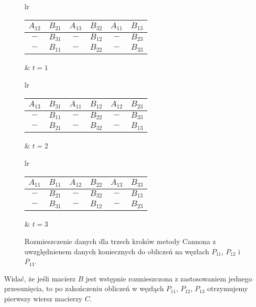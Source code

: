 \begin{figure}[H]
\centering
\begin{tabular}{lr}
\begin{tabular}{|cc|cc|cc|}
\hline
\(A_{12}\) & \(B_{21}\) & \(A_{13}\) & \(B_{32}\) & \(A_{11}\) & \(B_{13}\) \\
\hline
\(-\) & \(B_{31}\) & \(-\) & \(B_{12}\) & \(-\) & \(B_{23}\) \\
\hline
\(-\) & \(B_{11}\) & \(-\) & \(B_{22}\) & \(-\) & \(B_{33} \) \\
\hline
\end{tabular} &
\hspace{1cm}\(t=1\)
\end{tabular}

\vspace{0.5cm}

\begin{tabular}{lr}
\begin{tabular}{|cc|cc|cc|}
\hline
\(A_{13}\) & \(B_{31}\) & \(A_{11}\) & \(B_{12}\) & \(A_{12}\) & \(B_{23}\) \\
\hline
\(-\) & \(B_{11}\) & \(-\) & \(B_{22}\) & \(-\) & \(B_{33}\) \\
\hline
\(-\) & \(B_{21}\) & \(-\) & \(B_{32}\) & \(-\) & \(B_{13} \) \\
\hline
\end{tabular} &
\hspace{1cm}\(t=2\)
\end{tabular}

\vspace{0.5cm}

\begin{tabular}{lr}
\begin{tabular}{|cc|cc|cc|}
\hline
\(A_{11}\) & \(B_{11}\) & \(A_{12}\) & \(B_{22}\) & \(A_{13}\) & \(B_{33}\) \\
\hline
\(-\) & \(B_{21}\) & \(-\) & \(B_{32}\) & \(-\) & \(B_{13}\) \\
\hline
\(-\) & \(B_{31}\) & \(-\) & \(B_{12}\) & \(-\) & \(B_{23} \) \\
\hline
\end{tabular} &
\hspace{1cm}\(t=3\)
\end{tabular}
\caption{Rozmieszczenie danych dla trzech kroków metody Cannona z uwzględnienem danych koniecznych do obliczeń na węzłach \(P_{11}\), \(P_{12}\) i \(P_{13}\).}
\label{fig:cannon_torus4}
\end{figure}

\noindent Widać, że jeśli macierz \(B\) jest wstępnie rozmieszczona z zastosowaniem jednego przesunięcia, to po zakończeniu obliczeń w węzłąch \(P_{11}\), \(P_{12}\), \(P_{13}\) otrzymujemy pierwszy wiersz macierzy \(C\).

